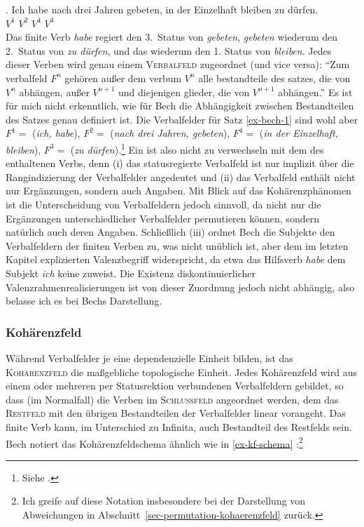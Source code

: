 \exg. Ich habe nach drei Jahren gebeten, in der Einzelhaft bleiben {zu dürfen}.\\
{} $V^1$ {} {} {} $V^2$ {} {} {} $V^4$ $V^3$\label{ex-bech-1}\\

Das finite Verb {\it habe} regiert den 3.~Status von {\it gebeten}, {\it gebeten} wiederum den 2.~Status von {\it zu dürfen}, und das wiederum den 1. Status von {\it bleiben}. Jedes dieser Verben wird genau einem \textsc{Verbalfeld} zugeordnet (und vice versa): "`Zum verbalfeld $F^n$ gehören au\ss er dem verbum $V^n$ alle bestandteile des satzes, die von $V^n$ abhängen, au\ss er $V^{n+1}$ und diejenigen glieder, die von $V^{n+1}$ abhängen."' \citep[\S 36]{Bech:55} Es ist für mich nicht erkenntlich, wie für Bech die Abhängigkeit zwischen Bestandteilen des Satzes genau definiert ist. Die Verbalfelder für Satz \ref{ex-bech-1} sind wohl aber $F^1 =$ ({\it ich, habe}), $F^2 =$ ({\it nach drei Jahren, gebeten}), $F^4 =$ ({\it in der Einzelhaft, bleiben}), $F^3 =$ ({\it zu dürfen}).\footnote{Siehe \citet[\S 22]{Bech:55}.} Ein  ist also nicht zu verwechseln mit dem  des enthaltenen Verbs, denn (i) das statusregierte Verbalfeld ist nur implizit über die Rangindizierung der Verbalfelder angedeutet und (ii) das Verbalfeld enthält nicht nur Ergänzungen, sondern auch Angaben. Mit Blick auf das Kohärenzphänomen ist die Unterscheidung von Verbalfeldern jedoch sinnvoll, da nicht nur die Ergänzungen unterschiedlicher Verbalfelder permutieren können, sondern natürlich auch deren Angaben. Schlie\ss lich (iii) ordnet Bech die Subjekte den Verbalfeldern der finiten Verben zu, was nicht unüblich ist, aber dem im letzten Kapitel explizierten Valenzbegriff widerspricht, da etwa das Hilfsverb {\it habe} dem Subjekt {\it ich} keine  zuweist. Die Existenz diskontinuierlicher Valenzrahmenrealisierungen ist von dieser Zuordnung jedoch nicht abhängig, also belasse ich es bei Bechs Darstellung.  

\subsubsection*{Kohärenzfeld} 

Während Verbalfelder je eine dependenzielle Einheit bilden, ist das \textsc{Kohärenzfeld} die ma\ss gebliche topologische Einheit. Jedes Kohärenzfeld wird aus einem oder mehreren per Statusrektion verbundenen Verbalfeldern gebildet, so dass (im Normalfall) die Verben im \textsc{Schlussfeld} angeordnet werden, dem das \textsc{Restfeld} mit den übrigen Bestandteilen der Verbalfelder linear vorangeht. Das finite Verb kann, im Unterschied zu Infinita, auch Bestandteil des Restfelds sein. Bech notiert das Kohärenzfeldschema ähnlich wie in \ref{ex-kf-schema} \citep[\S 55]{Bech:55}:\footnote{Ich greife auf diese Notation insbesondere bei der Darstellung von Abweichungen in Abschnitt~\ref{sec-permutation-kohaerenzfeld} zurück.}  

